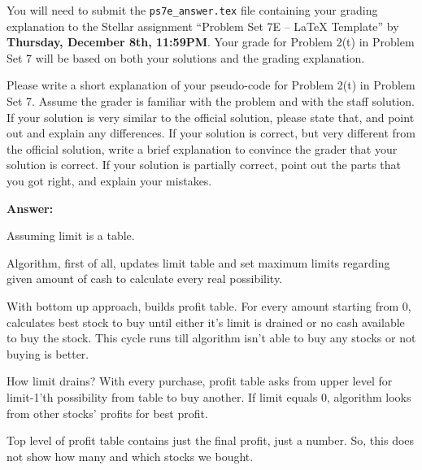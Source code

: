 \documentclass[12pt,twoside]{article}
\newcommand{\theproblemsetnum}{7E}
\newcommand{\releasedate}{December 7, 2011}
\begin{document}
\handout{Problem Set \theproblemsetnum}{\releasedate}
You will need to submit the \verb|ps7e_answer.tex| file containing your grading
explanation to the Stellar assignment ``Problem Set 7E -- LaTeX Template'' by
\textbf{Thursday, December 8th, 11:59PM}. Your grade for Problem 2(t) in
Problem Set 7 will be based on both your solutions and the grading explanation.
\medskip

\hrulefill

\begin{problems}

\problem Please write a short explanation of your pseudo-code for Problem 2(t)
in Problem Set 7. Assume the grader is familiar with the problem and with the
staff solution. If your solution is very similar to the official solution,
please state that, and point out and explain any differences. If your solution
is correct, but very different from the official solution, write a brief
explanation to convince the grader that your solution is correct. If your
solution is partially correct, point out the parts that you got right, and
explain your mistakes.

\textbf{Answer:}

Assuming limit is a table.

Algorithm, first of all, updates limit table and set maximum limits regarding
given amount of cash to calculate every real possibility.

With bottom up approach, builds profit table. For every amount starting from 0,
calculates best stock to buy until either it's limit is drained or no cash 
available to buy the stock. This cycle runs till algorithm isn't able to buy
any stocks or not buying is better.

How limit drains? With every purchase, profit table asks from upper level for
limit-1'th possibility from table to buy another. If limit equals 0, algorithm
looks from other stocks' profits for best profit.

Top level of profit table contains just the final profit, just a number.
So, this does not show how many and which stocks we bought.



\end{problems}
\end{document}
